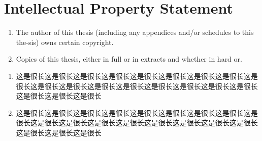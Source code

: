 \documentclass{report}
\begin{document}
	\chapter*{Intellectual Property Statement}
	
	\begin{enumerate}[i]
		\item The author of this thesis (including any appendices and/or schedules to this the-sis) owns certain copyright.
		\item Copies of this thesis, either in full or in extracts and whether in hard or.
	\end{enumerate}
	
	
	\begin{enumerate}
		\item 这是很长这是很长这是很长这是很长这是很长这是很长这是很长这是很长这是很长这是很长这是很长这是很长这是很长这是很长这是很长这是很长这是很长这是很长这是很长这是很长
		\item 这是很长这是很长这是很长这是很长这是很长这是很长这是很长这是很长这是很长这是很长这是很长这是很长这是很长这是很长这是很长这是很长这是很长这是很长这是很长这是很长
	\end{enumerate}
	
	
	
\end{document}
